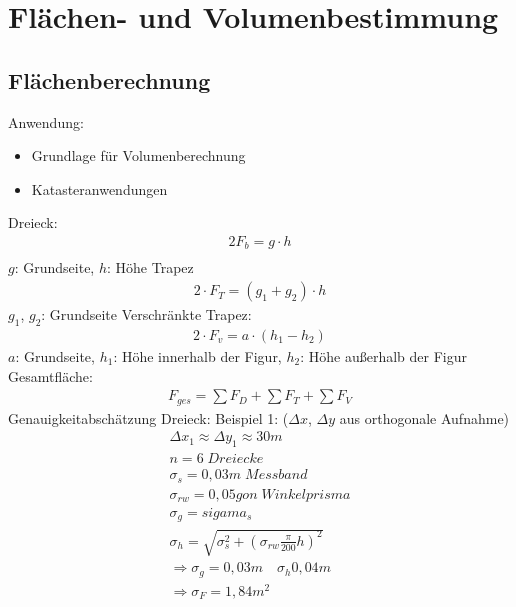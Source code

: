\documentclass[12pt]{article}
\begin{document}
	\pagestyle{main}
\tableofcontents
\newpage
\section{Flächen- und Volumenbestimmung}	
\subsection{Flächenberechnung}
Anwendung:
\begin{itemize}
	\item Grundlage für Volumenberechnung
	\item Katasteranwendungen
\end{itemize}
Dreieck:
\begin{gather*}
	2F_b = g \cdot h \\
\end{gather*}
$g$: Grundseite, $h$: Höhe \newline
Trapez
\begin{gather*}
	2 \cdot F_T = (g_1 + g_2) \cdot h
\end{gather*}
$g_1$, $g_2$: Grundseite \newline
Verschränkte Trapez:
\begin{gather*}
	2 \cdot F_v = a \cdot (h_1 - h_2)
\end{gather*}
$a$: Grundseite, $h_1$: Höhe innerhalb der Figur, $h_2$: Höhe außerhalb der Figur \newline
Gesamtfläche:
\begin{gather*}
	F_{ges} = \sum F_D + \sum F_T + \sum F_V
\end{gather*}
Genauigkeitabschätzung Dreieck: \newline
Beispiel 1: ($\Delta x$, $\Delta y$ aus orthogonale Aufnahme)
\begin{gather*}
	\Delta x_1 \approx \Delta y_1 \approx 30m \\
	n = 6\; Dreiecke \\
	\sigma_s = 0,03m\; Messband \\
	\sigma_{rw} = 0,05 gon\; Winkelprisma \\
	\sigma_g = sigama_s \\
	\sigma_h = \sqrt{\sigma_s^2 + (\sigma_{rw} \frac{\pi}{200} h)^2} \\
	\Longrightarrow \sigma_g = 0,03 m\quad \sigma_h0,04m \\
	\Longrightarrow \sigma_F = 1,84 m^2
\end{gather*}
\end{document}
